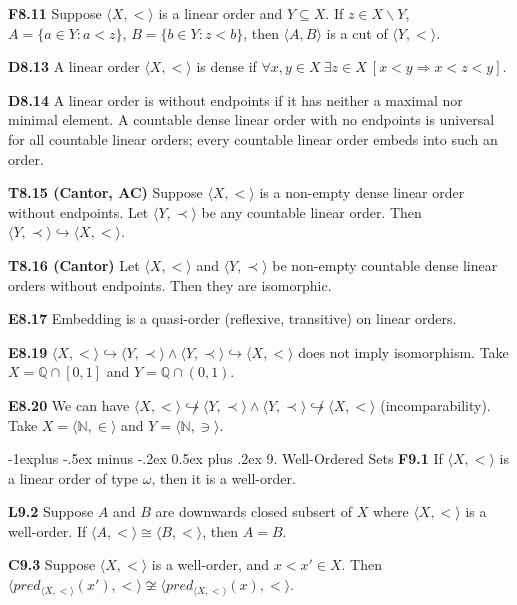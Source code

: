 \documentclass[10pt, landscape]{article}
\makeatletter
\renewcommand{\section}{\@startsection{section}{1}{0mm}%
                                {-1ex plus -.5ex minus -.2ex}%
                                {0.5ex plus .2ex}%
                                {\normalfont\large\bfseries}}
\renewcommand{\section}{\@startsection{section}{2}{0mm}%
                                {-1explus -.5ex minus -.2ex}%
                                {0.5ex plus .2ex}%
                                {\normalfont\normalsize\bfseries}}
\makeatother
\begin{document}
\begin{multicols*}{3}
\textbf{F8.11} Suppose $\langle X, < \rangle$ is a linear order and $Y \subseteq X$. If $z \in X \backslash Y$, $A=\{a \in Y:a<z\}$, $B=\{b \in Y: z <b\}$, then $\langle A, B \rangle$ is a cut of $\langle Y, < \rangle$.

\textbf{D8.13} A linear order $\langle X, < \rangle$ is dense if $\forall x, y \in X \ \exists z \in X \ [x < y \Rightarrow x < z < y]$.

\textbf{D8.14} A linear order is without endpoints if it has neither a maximal nor minimal element. A countable dense linear order with no endpoints is universal for all countable linear orders; every countable linear order embeds into such an order.

\textbf{T8.15 (Cantor, AC)} Suppose $\langle X, < \rangle$ is a non-empty dense linear order without endpoints. Let $\langle Y, \prec \rangle$ be any countable linear order. Then $\langle Y, \prec \rangle \hookrightarrow \langle X, < \rangle$.

\textbf{T8.16 (Cantor)} Let $\langle X, < \rangle$ and $\langle Y, \prec \rangle$ be non-empty countable dense linear orders without endpoints. Then they are isomorphic.

\textbf{E8.17} Embedding is a quasi-order (reflexive, transitive) on linear orders.

\textbf{E8.19} $\langle X, < \rangle \hookrightarrow \langle Y, \prec \rangle \land \langle Y, \prec \rangle \hookrightarrow \langle X, < \rangle$ does not imply isomorphism. Take $X=\mathbb{Q} \cap [0, 1]$ and $Y=\mathbb{Q} \cap (0, 1)$.

\textbf{E8.20} We can have $\langle X, < \rangle \not \hookrightarrow \langle Y, \prec \rangle \land \langle Y, \prec \rangle \not \hookrightarrow \langle X, < \rangle$ (incomparability). Take $X=\langle \mathbb{N}, \in \rangle$ and $Y=\langle \mathbb{N}, \ni \rangle$.

\section{9. Well-Ordered Sets}
\textbf{F9.1} If $\langle X, < \rangle$ is a linear order of type $\omega$, then it is a well-order.

\textbf{L9.2} Suppose $A$ and $B$ are downwards closed subsert of $X$ where $\langle X, < \rangle$ is a well-order. If $\langle A, <\rangle\cong\langle B, <\rangle$, then $A=B$.

\textbf{C9.3} Suppose $\langle X, < \rangle$ is a well-order, and $x<x'\in X$. Then $\langle pred_{\langle X, < \rangle}(x'), <\rangle \not\cong \langle pred_{\langle X, < \rangle}(x), <\rangle$.


\end{multicols*}
\end{document}
